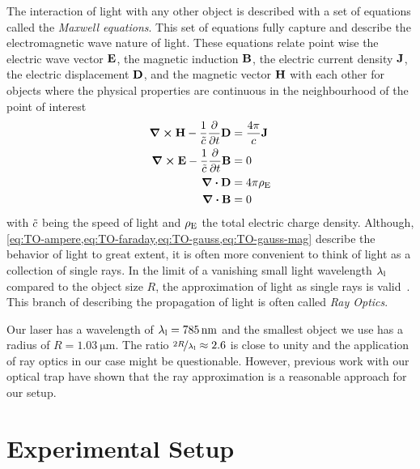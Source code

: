The interaction of light with any other object is described with a set of 
equations called the \emph{Maxwell equations}. This set of equations fully 
capture and describe the electromagnetic wave nature of light. These equations 
relate point wise the electric wave vector $\vb{E}$, the magnetic induction 
$\vb{B}$, the electric current density $\vb{J}$, the electric displacement 
$\vb{D}$, and the magnetic vector $\vb{H}$ with each other for objects where 
the physical properties are continuous in the neighbourhood of the point of 
interest~\cite{Born1980Ch1}
\begin{subequations}
  \begin{align}
    \curl{\vb{H}} - \frac{1}{\tilde{c}}\pdv{t}\vb{D} 
    &=\frac{4\pi}{c}\vb{J} \label{eq:TO-ampere} \\
    \curl{\vb{E}} - \frac{1}{\tilde{c}}\pdv{t}\vb{B} &=  0
    \label{eq:TO-faraday} \\
    \div{\vb{D}} &= 4\pi\rho_{\mathrm{E}}
    \label{eq:TO-gauss} \\
    \div{\vb{B}} &= 0
    \label{eq:TO-gauss-mag}
  \end{align}
\end{subequations}
with $\tilde{c}$ being the speed of light and $\rho_{\mathrm{E}}$ the total 
electric charge density. Although, 
\cref{eq:TO-ampere,eq:TO-faraday,eq:TO-gauss,eq:TO-gauss-mag} describe the 
behavior of light to great extent, it is often more convenient to think of 
light as a collection of single rays. In the limit of a vanishing small light 
wavelength $\lambda_{\mathrm{l}}$ compared to the object size $R$, the approximation of light 
as single rays is valid~\cite{Born1980Ch3}. This branch of describing the 
propagation of light is often called \emph{Ray Optics}.

Our laser has a wavelength of $\lal=\SI{785}{\nm}$ and the smallest object we 
use has a radius of $R=\SI{1.03}{\um}$. The ratio $\nicefrac{2R}{\lambda_{\mathrm{l}}}\approx 
2.6$ is close to unity and the application of ray optics in our case might be 
questionable. However, previous work with our optical trap
\cite{Lakaemper2015,Lamprecht2016,Lamprecht2017} have shown that the ray 
approximation is a reasonable approach for our setup.

\section{Experimental Setup}

